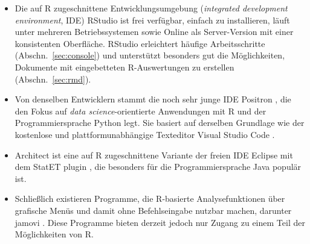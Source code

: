 \begin{itemize}
\item Die auf R zugeschnittene Entwicklungsumgebung (\emph{integrated development environment}, IDE) RStudio \cite{Allaire2011} ist frei verfügbar, einfach zu installieren, läuft unter mehreren Betriebssystemen sowie Online als Server-Version mit einer konsistenten Oberfläche. RStudio erleichtert häufige Arbeitsschritte (Abschn.\ \ref{sec:console}) und unterstützt besonders gut die Möglichkeiten, Dokumente mit eingebetteten R-Auswertungen zu erstellen (Abschn.\ \ref{sec:rmd}).
\item Von denselben Entwicklern stammt die noch sehr junge IDE Positron \cite{Posit2024}, die den Fokus auf \emph{data science}-orientierte Anwendungen mit R und der Programmiersprache Python legt. Sie basiert auf derselben Grundlage wie der kostenlose und plattformunabhängige Texteditor Visual Studio Code \cite{Microsoft2024}.%
\item Architect \cite{OpenAnalytics2013} ist eine auf R zugeschnittene Variante der freien IDE Eclipse mit dem StatET plugin \cite{Wahlbrink2008}, die besonders für die Programmiersprache Java populär ist. %
\item Schließlich existieren Programme, die R-basierte Analysefunktionen über grafische Menüs und damit ohne Befehlseingabe nutzbar machen, darunter jamovi \cite{Love2024}. Diese Programme bieten derzeit jedoch nur Zugang zu einem Teil der Möglichkeiten von R.
\end{itemize}

